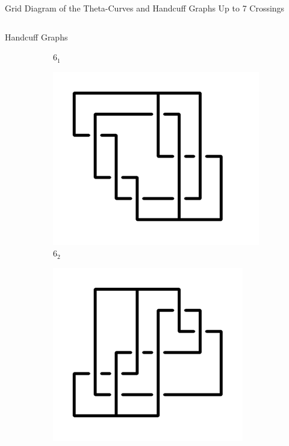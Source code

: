 \documentclass[final]{beamer}
\begin{document}
\begin{frame}[t]
\begin{alertblock}{Grid Diagram of the Theta-Curves and Handcuff Graphs Up to 7 Crossings}
\begin{columns}[t]
\begin{column}{0.5\textwidth}
\begin{alertblock}{Handcuff Graphs}
\begin{figure}
\begin{subfigure}{0.075\textwidth}
    \caption{$6_{1}$} 
    \end{subfigure}
    \begin{subfigure}{0.075\textwidth}
    \includegraphics[width=\columnwidth]{../Midterm_Poster/grid_diagram/handcuff_6_2.png}
    \caption{$6_{2}$} 
    \end{subfigure}
    \begin{subfigure}{0.075\textwidth}
    \includegraphics[width=\columnwidth]{../Midterm_Poster/grid_diagram/handcuff_6_3.png}

\end{subfigure}
\end{figure}
\end{alertblock}
\end{column}
\end{columns}
\end{alertblock}
\end{frame}
\end{document}
